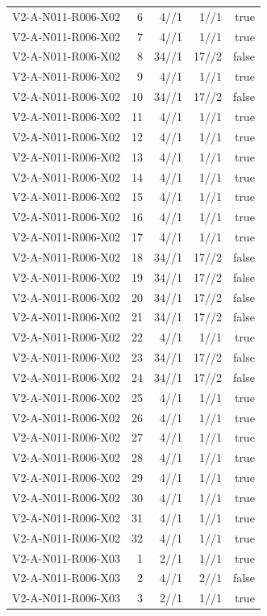 {\begin{longtable}{lrrrr}
V2-A-N011-R006-X02 & 6 & 4//1 & 1//1 & true \\
V2-A-N011-R006-X02 & 7 & 4//1 & 1//1 & true \\
V2-A-N011-R006-X02 & 8 & 34//1 & 17//2 & false \\
V2-A-N011-R006-X02 & 9 & 4//1 & 1//1 & true \\
V2-A-N011-R006-X02 & 10 & 34//1 & 17//2 & false \\
V2-A-N011-R006-X02 & 11 & 4//1 & 1//1 & true \\
V2-A-N011-R006-X02 & 12 & 4//1 & 1//1 & true \\
V2-A-N011-R006-X02 & 13 & 4//1 & 1//1 & true \\
V2-A-N011-R006-X02 & 14 & 4//1 & 1//1 & true \\
V2-A-N011-R006-X02 & 15 & 4//1 & 1//1 & true \\
V2-A-N011-R006-X02 & 16 & 4//1 & 1//1 & true \\
V2-A-N011-R006-X02 & 17 & 4//1 & 1//1 & true \\
V2-A-N011-R006-X02 & 18 & 34//1 & 17//2 & false \\
V2-A-N011-R006-X02 & 19 & 34//1 & 17//2 & false \\
V2-A-N011-R006-X02 & 20 & 34//1 & 17//2 & false \\
V2-A-N011-R006-X02 & 21 & 34//1 & 17//2 & false \\
V2-A-N011-R006-X02 & 22 & 4//1 & 1//1 & true \\
V2-A-N011-R006-X02 & 23 & 34//1 & 17//2 & false \\
V2-A-N011-R006-X02 & 24 & 34//1 & 17//2 & false \\
V2-A-N011-R006-X02 & 25 & 4//1 & 1//1 & true \\
V2-A-N011-R006-X02 & 26 & 4//1 & 1//1 & true \\
V2-A-N011-R006-X02 & 27 & 4//1 & 1//1 & true \\
V2-A-N011-R006-X02 & 28 & 4//1 & 1//1 & true \\
V2-A-N011-R006-X02 & 29 & 4//1 & 1//1 & true \\
V2-A-N011-R006-X02 & 30 & 4//1 & 1//1 & true \\
V2-A-N011-R006-X02 & 31 & 4//1 & 1//1 & true \\
V2-A-N011-R006-X02 & 32 & 4//1 & 1//1 & true \\
V2-A-N011-R006-X03 & 1 & 2//1 & 1//1 & true \\
V2-A-N011-R006-X03 & 2 & 4//1 & 2//1 & false \\
V2-A-N011-R006-X03 & 3 & 2//1 & 1//1 & true \\

\end{longtable}}

